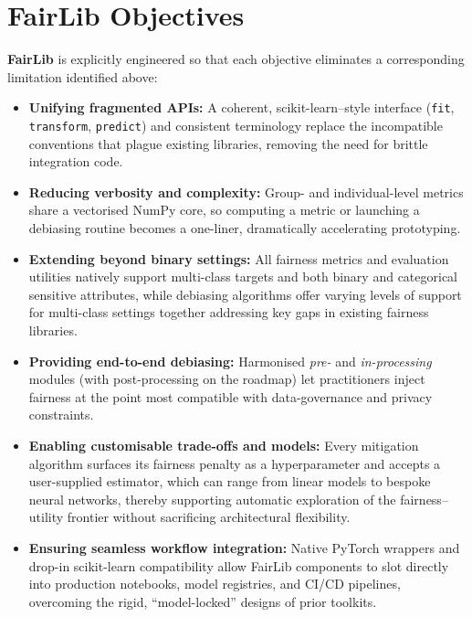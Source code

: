 \documentclass[12pt,a4paper,openright,twoside]{book}
\begin{document}
\section{FairLib Objectives}
\textbf{FairLib} is explicitly engineered so that each objective eliminates a
corresponding limitation identified above:

\begin{itemize}
  \item \textbf{Unifying fragmented APIs:}  
  A coherent, scikit-learn–style interface
  (\texttt{fit}, \texttt{transform}, \texttt{predict}) and consistent terminology
  replace the incompatible conventions that plague existing libraries,
  removing the need for brittle integration code.

  \item \textbf{Reducing verbosity and complexity:}  
  Group- and individual-level metrics share a vectorised NumPy core, so
  computing a metric or launching a debiasing routine becomes a one-liner,
  dramatically accelerating prototyping.

  \item \textbf{Extending beyond binary settings:}  
  All fairness metrics and evaluation utilities natively support multi-class targets and both binary and categorical sensitive attributes, while debiasing algorithms offer varying levels of support for multi-class settings together addressing key gaps in existing fairness libraries.

  \item \textbf{Providing end-to-end debiasing:}  
  Harmonised \emph{pre-} and \emph{in-processing} modules (with
  post-processing on the roadmap) let practitioners inject fairness at the
  point most compatible with data-governance and privacy constraints.

  \item \textbf{Enabling customisable trade-offs and models:}  
  Every mitigation algorithm surfaces its fairness penalty as a hyperparameter and accepts a user-supplied estimator, which can range from linear models to bespoke neural networks, thereby supporting automatic exploration of the fairness–utility frontier without sacrificing architectural flexibility.

  \item \textbf{Ensuring seamless workflow integration:}  
  Native PyTorch wrappers and drop-in scikit-learn compatibility allow FairLib components to slot directly into production notebooks, model registries, and CI/CD pipelines, overcoming the rigid, “model-locked” designs of prior toolkits.
\end{itemize}
\end{document}
